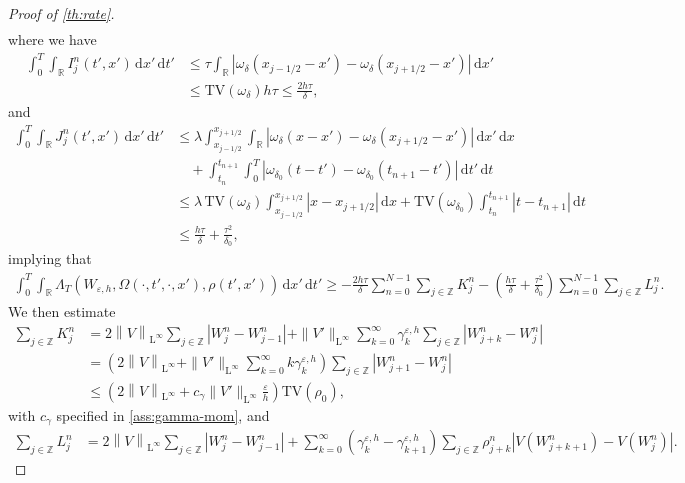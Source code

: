 \documentclass[10pt]{amsart}
\theoremstyle{plain}
\theoremstyle{definition}
\numberwithin{equation}{section}
\newcommand{\eps}{{\varepsilon}}
\newcommand{\norm}[1]{\left\lVert#1\right\rVert}
\newcommand{\dt}{{\, \mathrm{d}t}}
\newcommand{\dx}{{\, \mathrm{d}x}}
\begin{document}
\begin{proof}[Proof of \cref{th:rate}]
\begin{align*}
\end{align*}
where we have
\begin{align*}
    \int_0^T\int_{\mathbb{R}} I_j^n(t',x') \dx'\dt' &\leq \tau\int_{\mathbb{R}} \left| \omega_\delta(x_{j-1/2}-x') - \omega_\delta(x_{j+1/2}-x') \right| \dx' \\
    &\leq \mathrm{TV}(\omega_\delta)h\tau \leq \frac{2h\tau}{\delta},
\end{align*}
and
\begin{align*}
    \int_0^T\int_{\mathbb{R}} J_j^n(t',x') \dx'\dt' &\leq \lambda \int_{x_{j-1/2}}^{x_{j+1/2}} \int_{\mathbb{R}} \left| \omega_\delta(x-x') - \omega_\delta(x_{j+1/2}-x') \right| \dx' \dx \\
    &\quad + \int_{t_n}^{t_{n+1}} \int_0^T \left| \omega_{\delta_0}(t-t') - \omega_{\delta_0}(t_{n+1}-t') \right| \dt' \dt \\
    &\leq \lambda\, \mathrm{TV}(\omega_\delta) \int_{x_{j-1/2}}^{x_{j+1/2}} |x-x_{j+1/2}| \dx + \mathrm{TV}(\omega_{\delta_0}) \int_{t_n}^{t_{n+1}} |t-t_{n+1}| \dt \\
    &\leq \frac{h\tau}{\delta} + \frac{\tau^2}{\delta_0},
\end{align*}
implying that
\begin{align*}
    \int_0^T\int_{\mathbb{R}} \Lambda_T(W_{\eps,h}, \Omega(\cdot,t',\cdot,x'),\rho(t',x')) \dx'\dt' \geq -\frac{2h\tau}{\delta} \sum_{n=0}^{N-1} \sum_{j\in\mathbb{Z}} K_j^n - \left( \frac{h\tau}{\delta} + \frac{\tau^2}{\delta_0} \right) \sum_{n=0}^{N-1} \sum_{j\in\mathbb{Z}} L_j^n.
\end{align*}
We then estimate
\begin{align*}
    \sum_{j\in\mathbb{Z}} K_j^n &= 2\norm{V}_{\mathrm{L}^{\infty}} \sum_{j\in\mathbb{Z}} |W_j^n-W_{j-1}^n| + \|V'\|_{\mathrm{L}^\infty} \sum_{k=0}^\infty \gamma_k^{\eps,h} \sum_{j\in\mathbb{Z}} |W_{j+k}^n-W_j^n| \\
    &= \left( 2\norm{V}_{\mathrm{L}^{\infty}} + \|V'\|_{\mathrm{L}^\infty} \sum_{k=0}^\infty k\gamma_k^{\eps,h} \right) \sum_{j\in\mathbb{Z}} |W_{j+1}^n-W_j^n| \\
    &\leq \left( 2\norm{V}_{\mathrm{L}^{\infty}} + c_\gamma \|V'\|_{\mathrm{L}^\infty} \frac{\eps}h \right) \mathrm{TV}(\rho_0),
\end{align*}
with $c_\gamma$ specified in \cref{ass:gamma-mom}, and
\begin{align*}
    \sum_{j\in\mathbb{Z}} L_j^n &= 2\norm{V}_{\mathrm{L}^{\infty}} \sum_{j\in\mathbb{Z}} |W_j^n-W_{j-1}^n| + \sum_{k=0}^\infty \left(\gamma_k^{\eps,h}-\gamma_{k+1}^{\eps,h}\right) \sum_{j\in\mathbb{Z}} \rho_{j+k}^n \left|V(W_{j+k+1}^n) -V(W_j^n)\right|.

\end{align*}
\end{proof}
\end{document}
